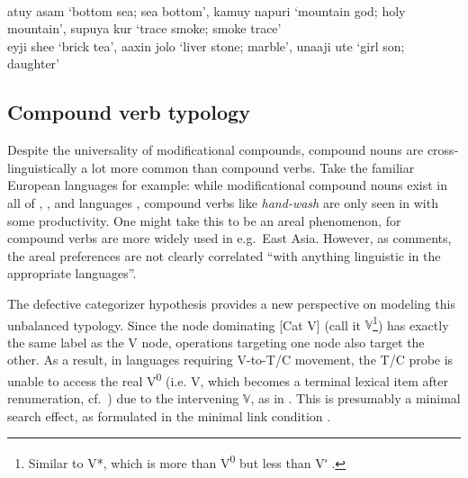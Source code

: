 \documentclass[output=paper]{langsci/langscibook}
\begin{document}
\ea
\ea\label{ex:ainu}
\\
atuy asam {`bottom sea; sea bottom',} kamuy napuri {`mountain god; holy mountain',} supuya kur {`trace smoke; smoke trace'}
\ex\label{ex:evenki}
\\
eyji shee {`brick tea',} aaxin jolo {`liver stone; marble',} unaaji ute {`girl son; daughter'}
\z
\z

\subsection{Compound verb typology}\label{sec5.3}

Despite the universality of modificational compounds, compound nouns are
cross-linguistically a lot more common than compound verbs. Take the familiar
Eu\-ro\-pean languages for example: while modificational compound nouns exist
in all of , , and  languages \citep[cf.][]{Bauer2009},
compound verbs like {\it hand-wash} are only seen in  with some
productivity. One might take this to be an areal phenomenon, for compound verbs
are more widely used in e.g.\ East Asia. However, as \citet[355]{Bauer2009}
comments, the areal preferences are not clearly correlated ``with anything
linguistic in the appropriate languages''.

The defective categorizer hypothesis provides a new perspective on modeling
this unbalanced typology. Since the node dominating
[Cat\textsubscript{\textsurd} V\textsubscript{\textsurd}] (call it
$\mathbb{V}$\footnote{Similar to  V*, which is more than
V\textsuperscript{0} but less than Vʹ \citep[cf.][]{Vikner2005}.}) has exactly
the same label as the V\textsubscript{\textsurd} node, operations targeting one
node also target the other. As a result, in languages requiring V-to-T/C
movement, the T/C probe is unable to access the real V\textsuperscript{0} (i.e.
V\textsubscript{\textsurd}, which becomes a terminal lexical item after
renumeration, cf.\ ) due to the intervening $\mathbb{V}$, as in
. This is presumably a minimal search effect, as formulated in the
minimal link condition .
\end{document}
